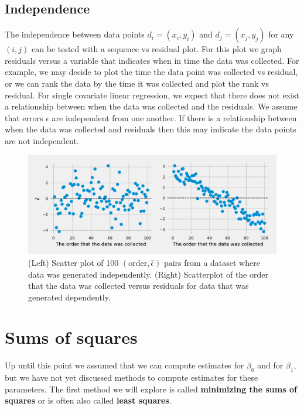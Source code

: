 \subsection{Independence}

The independence between data points $d_{i} = (x_{i}, y_{i})$ and $d_{j} = (x_{j}, y_{j})$ for any $(i,j)$ can be tested with a sequence vs residual plot. 
For this plot we graph residuals versus a variable that indicates when in time the data was collected. 
For example, we may decide to plot the time the data point was collected vs residual, or we can rank the data by the time it was collected and plot the rank vs residual.
For single covariate linear regression, we expect that there does not exist a relationship between when the data was collected and the residuals.
We assume that errors $\epsilon$ are independent from one another.
If there is a relationship between when the data was collected and residuals then this may indicate the data points are not independent.

\begin{figure}
    \centering
    \includegraphics[width=\textwidth]{chapters/chapter7/ch6_residuals_vs_sequence.pdf}
    \caption{(Left) Scatter plot of 100 $(\text{order},\hat{\epsilon})$ pairs from a dataset where data was generated independently. 
    (Right) Scatterplot of the order that the data was collected versus residuals for data that was generated dependently. \label{fig.residualsDiag}}
\end{figure}


\section{Sums of squares}

Up until this point we assumed that we can compute estimates for $\beta_{0}$ and for $\beta_{1}$, but we have not yet discussed methods to compute estimates for these parameters. 
The first method we will explore is called \textbf{minimizing the sums of squares} or is often also called \textbf{least squares}.


